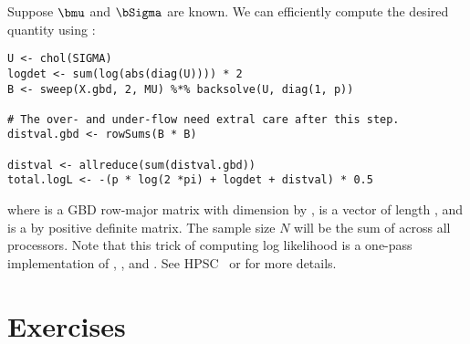 Suppose $\bmu$ and $\bSigma$ are known.
We can efficiently compute the desired quantity using \pbdR:
\begin{lstlisting}[language=rr,title=R Code]
U <- chol(SIGMA)
logdet <- sum(log(abs(diag(U)))) * 2
B <- sweep(X.gbd, 2, MU) %*% backsolve(U, diag(1, p))

# The over- and under-flow need extral care after this step.
distval.gbd <- rowSums(B * B)

distval <- allreduce(sum(distval.gbd))
total.logL <- -(p * log(2 *pi) + logdet + distval) * 0.5
\end{lstlisting}
where  is a GBD row-major matrix with dimension
 by ,  is a vector of length , and
 is a  by  positive definite matrix.
The sample size $N$ will be the sum of  across all processors.
Note that this trick of computing log likelihood is a one-pass implementation
of , , and .
See HPSC~\citep{hpsc2011} or \citet{gvl} for more details.




\section{Exercises}
\label{sec:mle_exercise}

